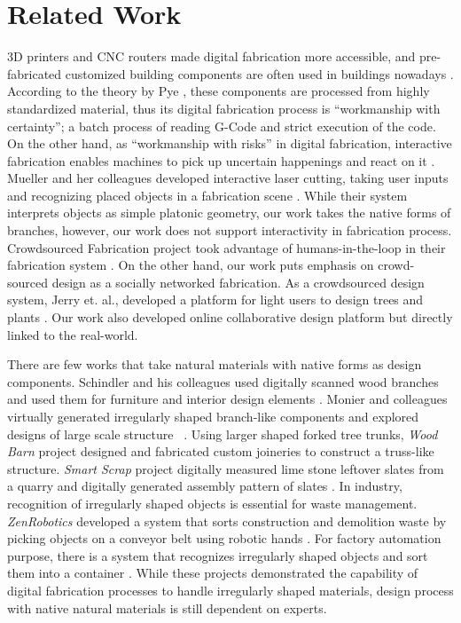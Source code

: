 \section{Related Work}
3D printers and CNC routers made digital fabrication more accessible, and pre-fabricated customized building components are often used in buildings nowadays \cite{knaack2012prefabricated}.
According to the theory by Pye , these components are processed from highly standardized material, thus its digital fabrication process is ``workmanship with certainty''; a batch process of reading G-Code and strict execution of the code.
On the other hand, as ``workmanship with risks'' in digital fabrication, interactive fabrication enables machines to pick up uncertain happenings and react on it \cite{willis2011interactive}.
Mueller and her colleagues developed interactive laser cutting, taking user inputs and recognizing placed objects in a fabrication scene \cite{Mueller:2012:ICI:2380116.2380191}.
While their system interprets objects as simple platonic geometry, our work takes the native forms of branches, however, our work does not support interactivity in fabrication process.
Crowdsourced Fabrication project took advantage of humans-in-the-loop in their fabrication system \cite{lafreniere2016crowdsourced}.
On the other hand, our work puts emphasis on crowd-sourced design as a socially networked fabrication.
As a crowdsourced design system, Jerry et. al., developed a platform for light users to design trees and plants \cite{talton2009exploratory}.
Our work also developed online collaborative design platform but directly linked to the real-world.

There are few works that take natural materials with native forms as design components.
Schindler and his colleagues used digitally scanned wood branches and used them for furniture and interior design elements \cite{schindler2014processing}.
Monier and colleagues virtually generated irregularly shaped branch-like components and explored designs of large scale structure ~\cite{monier2013use}.
Using larger shaped forked tree trunks, \textit{Wood Barn} project designed and fabricated custom joineries to construct a truss-like structure\cite{woodbarn}.
\textit{Smart Scrap} project digitally measured lime stone leftover slates from a quarry and digitally generated assembly pattern of slates \cite{smartscrap}.
In industry, recognition of irregularly shaped objects is essential for waste management.
\textit{ZenRobotics} developed a system that sorts construction and demolition waste by picking objects on a conveyor belt using robotic hands \cite{lukka2014zenrobotics}.
For factory automation purpose, there is a system that recognizes irregularly shaped objects and sort them into a container \cite{sujan2000design}.
While these projects demonstrated the capability of digital fabrication processes to handle irregularly shaped materials, design process with native natural materials is still dependent on experts.

